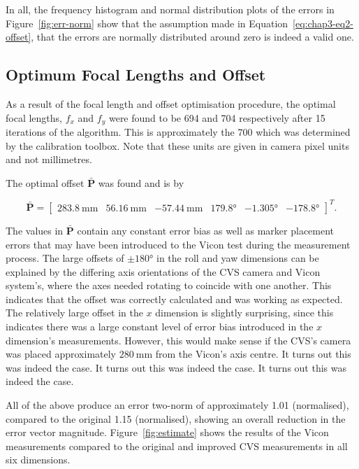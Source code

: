 In all, the frequency histogram and normal distribution plots of the errors in Figure~\ref{fig:err-norm} show that the assumption made in Equation~\ref{eq:chap3-eq2-offset}, that the errors are normally distributed around zero is indeed a valid one. 

\subsection{Optimum Focal Lengths and Offset}

As a result of the focal length and offset optimisation procedure, the optimal focal lengths, $f_x$ and $f_y$ were found to be 694 and 704 respectively after 15 iterations of the algorithm. This is approximately the 700 which was determined by the calibration toolbox. Note that these units are given in camera pixel units and not millimetres.

The optimal offset $\bar{\bm{P}}$ was found and is by 

\begin{equation}
  \label{eq:chap3-offset-value}
  \bar{\bm{P}} = 
  \begin{bmatrix}
    \SI{283.8}{\mm} & \SI{56.16}{\mm} & \SI{-57.44}{\mm} & \ang{179.8} & \ang{-1.305} & \ang{-178.8}
  \end{bmatrix}^T.
\end{equation}

The values in $\bar{\bm{P}}$ contain any constant error bias as well as marker placement errors that may have been introduced to the Vicon test during the measurement process. The large offsets of $\pm\ang{180}$ in the roll and yaw dimensions can be explained by the differing axis orientations of the CVS camera and Vicon system's, where the axes needed rotating to coincide with one another. This indicates that the offset was correctly calculated and was working as expected. The relatively large offset in the $x$ dimension is slightly surprising, since this indicates there was a large constant level of error bias introduced in the $x$ dimension's measurements. However, this would make sense if the CVS's camera was placed approximately $\SI{280}{\mm}$ from the Vicon's axis centre. It turns out this was indeed the case. It turns out this was indeed the case. It turns out this was indeed the case. 

All of the above produce an error two-norm of approximately 1.01 (normalised), compared to the original 1.15 (normalised), showing an overall reduction in the error vector magnitude. Figure~\ref{fig:estimate} shows the results of the Vicon measurements compared to the original and improved CVS measurements in all six dimensions.

